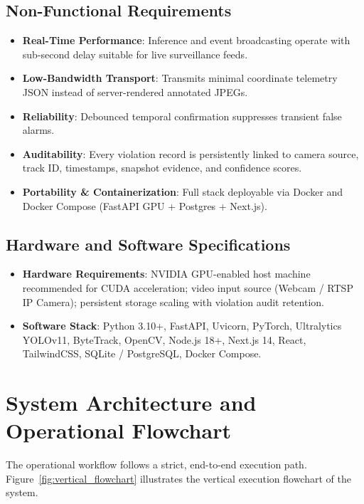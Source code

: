 \documentclass[11pt,a4paper]{article}
\begin{document}
\subsection{Non-Functional Requirements}
\begin{itemize}[leftmargin=*]
    \item \textbf{Real-Time Performance}: Inference and event broadcasting operate with sub-second delay suitable for live surveillance feeds.
    \item \textbf{Low-Bandwidth Transport}: Transmits minimal coordinate telemetry JSON instead of server-rendered annotated JPEGs.
    \item \textbf{Reliability}: Debounced temporal confirmation suppresses transient false alarms.
    \item \textbf{Auditability}: Every violation record is persistently linked to camera source, track ID, timestamps, snapshot evidence, and confidence scores.
    \item \textbf{Portability \& Containerization}: Full stack deployable via Docker and Docker Compose (FastAPI GPU + Postgres + Next.js).
\end{itemize}

\subsection{Hardware and Software Specifications}
\begin{itemize}[leftmargin=*]
    \item \textbf{Hardware Requirements}: NVIDIA GPU-enabled host machine recommended for CUDA acceleration; video input source (Webcam / RTSP IP Camera); persistent storage scaling with violation audit retention.
    \item \textbf{Software Stack}: Python 3.10+, FastAPI, Uvicorn, PyTorch, Ultralytics YOLOv11, ByteTrack, OpenCV, Node.js 18+, Next.js 14, React, TailwindCSS, SQLite / PostgreSQL, Docker Compose.
\end{itemize}

\section{System Architecture and Operational Flowchart}

The operational workflow follows a strict, end-to-end execution path. Figure~\ref{fig:vertical_flowchart} illustrates the vertical execution flowchart of the system.
\end{document}
